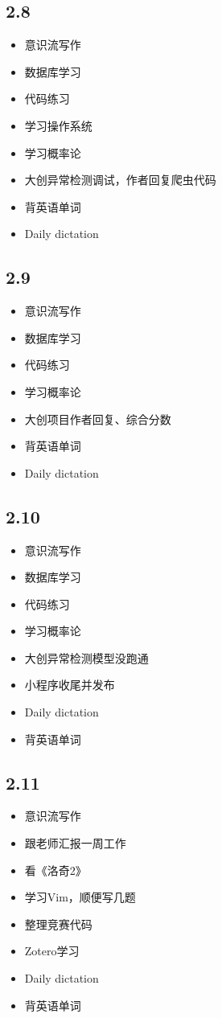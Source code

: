 \documentclass[UTF8]{ctexart}
\begin{document}
\subsection*{2.8}
\begin{itemize}
    \item 意识流写作
    \item 数据库学习
    \item 代码练习
    \item 学习操作系统
    \item 学习概率论
    \item 大创异常检测调试，作者回复爬虫代码
    \item 背英语单词
    \item Daily dictation
\end{itemize}
\subsection*{2.9}
\begin{itemize}
    \item 意识流写作
    \item 数据库学习
    \item 代码练习
    \item 学习概率论
    \item 大创项目作者回复、综合分数
    \item 背英语单词
    \item Daily dictation
\end{itemize}
\subsection*{2.10}
\begin{itemize}
    \item 意识流写作
    \item 数据库学习
    \item 代码练习
    \item 学习概率论
    \item 大创异常检测模型没跑通
    \item 小程序收尾并发布
    \item Daily dictation
    \item 背英语单词
\end{itemize}
\subsection*{2.11}
\begin{itemize}
    \item 意识流写作
    \item 跟老师汇报一周工作
    \item 看《洛奇2》
    \item 学习Vim，顺便写几题
    \item 整理竞赛代码
    \item Zotero学习
    \item Daily dictation
    \item 背英语单词
\end{itemize}
\end{document}
